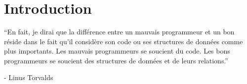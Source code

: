 \chapter*{Introduction}

\noindent ``En fait, je dirai que la différence entre un mauvais programmeur et un bon réside dans le fait qu'il considère son code ou ses structures de données comme plus importants. Les mauvais programmeurs se soucient du code. Les bons programmeurs se soucient des structures de données et de leurs relations.''

\hfill - Linus Torvalds